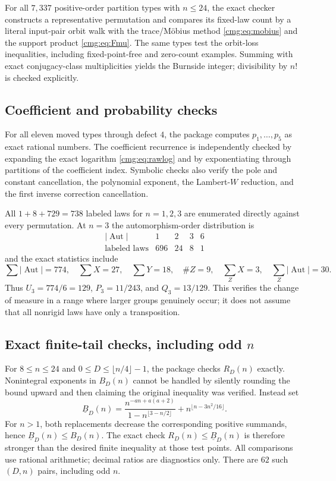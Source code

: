 \documentclass[11pt,letterpaper]{article}
\numberwithin{equation}{section}
\theoremstyle{definition}\newtheorem{definition}[theorem]{Definition}
\theoremstyle{remark}\newtheorem{remark}[theorem]{Remark}
\newcommand{\Aut}{\operatorname{Aut}}\newcommand{\Fix}{\operatorname{Fix}}
\begin{document}
For all $7{,}337$ positive-order partition types with $n\le24$, the exact checker constructs a representative permutation and compares its fixed-law count by a literal input-pair orbit walk with the trace/M\"obius method \eqref{cmg:eq:mobius} and the support product \eqref{cmg:eq:Fmu}. The same types test the orbit-loss inequalities, including fixed-point-free and zero-count examples. Summing with exact conjugacy-class multiplicities yields the Burnside integer; divisibility by $n!$ is checked explicitly.

\subsection{Coefficient and probability checks}
For all eleven moved types through defect $4$, the package computes $p_1,\ldots,p_5$ as exact rational numbers. The coefficient recurrence is independently checked by expanding the exact logarithm \eqref{cmg:eq:rawlog} and by exponentiating through partitions of the coefficient index. Symbolic checks also verify the pole and constant cancellation, the polynomial exponent, the Lambert-$W$ reduction, and the first inverse correction cancellation.

All $1+8+729=738$ labeled laws for $n=1,2,3$ are enumerated directly against every permutation. At $n=3$ the automorphism-order distribution is
\[
 \begin{array}{c|rrrr}
 |\Aut|&1&2&3&6\\\hline
 \text{labeled laws}&696&24&8&1
 \end{array}
\]
and the exact statistics include
\[
 \sum|\Aut|=774,\quad \sum X=27,\quad \sum Y=18,\quad
 \#Z=9,\quad \sum_ZX=3,\quad \sum_Z|\Aut|=30.
\]
Thus $U_3=774/6=129$, $P_3=11/243$, and $Q_3=13/129$. This verifies the change of measure in a range where larger groups genuinely occur; it does not assume that all nonrigid laws have only a transposition.

\subsection{Exact finite-tail checks, including odd $n$}
For $8\le n\le24$ and $0\le D\le\lfloor n/4\rfloor-1$, the package checks $R_D(n)$ exactly. Nonintegral exponents in $B_D(n)$ cannot be handled by silently rounding the bound upward and then claiming the original inequality was verified. Instead set
\begin{equation}\label{cmg:eq:rational-B}
 \underline B_D(n)=
 \frac{n^{-an+a(a+2)}}{1-n^{\lfloor3-n/2\rfloor}}
 +n^{\lfloor n-3n^2/16\rfloor}.
\end{equation}
For $n>1$, both replacements decrease the corresponding positive summands, hence $\underline B_D(n)\le B_D(n)$. The exact check $R_D(n)\le\underline B_D(n)$ is therefore stronger than the desired finite inequality at those test points. All comparisons use rational arithmetic; decimal ratios are diagnostics only. There are $62$ such $(D,n)$ pairs, including odd $n$.
\end{document}

